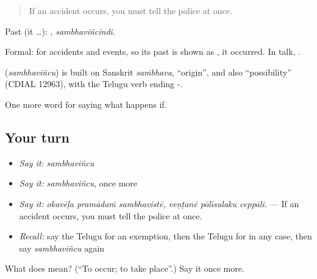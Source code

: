 \begin{quote}
If an accident occurs, you must tell the police at once.
\end{quote}

Past (it …): , \emph{sambhaviñcindi}.

Formal: for accidents and events, so its past is shown as , it occurred. In talk, .

\begin{cousinweb}
\textbf{} (\emph{sambhaviñcu}) is built on Sanskrit \emph{saṁbhava}, \textquotedblleft{}origin\textquotedblright{}, and also \textquotedblleft{}possibility\textquotedblright{} (CDIAL 12963), with the Telugu verb ending -.
\end{cousinweb}

\begin{grammarlens}[title={What you've built}]
One more word for saying what happens if.
\end{grammarlens}

\subsection*{Your turn}
\begin{itemize}
\raggedright
  \item \emph{Say it:} \emph{sambhaviñcu}
  \item \emph{Say it:} \emph{sambhaviñcu}, once more
  \item \emph{Say it:} \emph{okavēḷa pramādaṁ sambhavistē, veṇṭanē pōlīsulaku ceppāli.} — If an accident occurs, you must tell the police at once.
  \item \emph{Recall:} say the Telugu for an exemption, then the Telugu for in any case, then say \emph{sambhaviñcu} again
\end{itemize}

\begin{tcolorbox}[breakable,colback=teal!4,colframe=teal!35!black,title={Before you move on}]
What does  mean? (\textquotedblleft{}To occur; to take place\textquotedblright{}.) Say it once more.
\end{tcolorbox}
